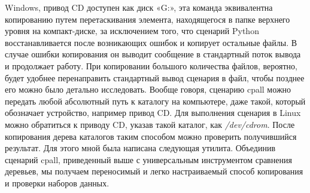 \documentclass[12pt]{article}
\begin{document}
Windows, привод CD доступен как диск «G:», эта команда эквивалентна
копированию путем перетаскивания элемента, находящегося в папке
верхнего уровня на компакт-диске, за исключением того, что сценарий Python восстанавливается после возникающих ошибок и копирует
остальные файлы. В случае ошибки копирования он выводит сообщение в стандартный поток вывода и продолжает работу. При копировании большого количества файлов, вероятно, будет удобнее перенаправить стандартный вывод сценария в файл, чтобы позднее его можно
было детально исследовать.
Вообще говоря, сценарию cpall можно передать любой абсолютный
путь к каталогу на компьютере, даже такой, который обозначает устройство, например привод CD. Для выполнения сценария в Linux можно обратиться к приводу CD, указав такой каталог, как \textit{/dev/cdrom}.
После копирования дерева каталогов таким способом можно проверить получившийся результат. Для этого мной была написана следующая утилита. Объединив сценарий cpall, приведенный выше с универсальным инструментом сравнения деревьев, мы получаем
переносимый и легко настраиваемый способ копирования и проверки
наборов данных.
\end{document}
